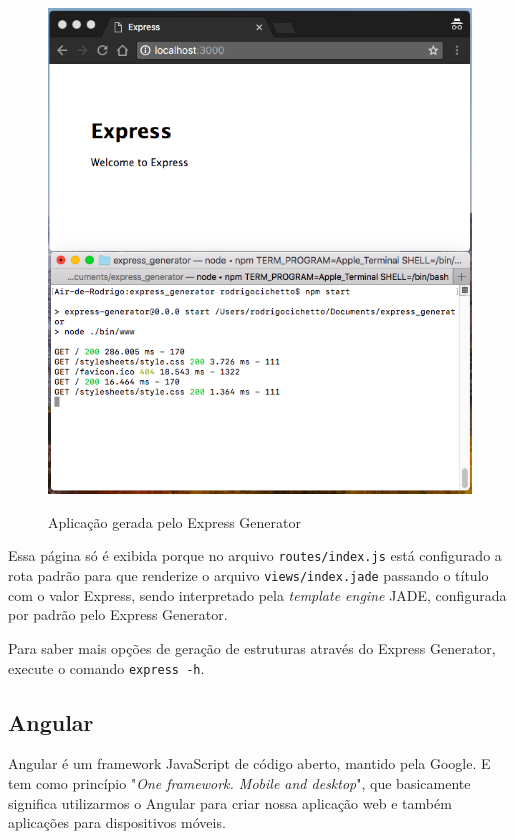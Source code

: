 \documentclass[
	12pt,				%
	openright,			%
	twoside,			%
	a4paper,			%
	english,			%
	brazil				%
	]{abntex2}
\begin{document}
\begin{figure}[h]
	\centering

	\caption{Aplicação gerada pelo Express Generator} \label{fig:ExpressGeneratorApp}
    \includegraphics[scale=0.5]{express-generator-app} \\

\end{figure}

Essa página só é exibida porque no arquivo \verb|routes/index.js| está configurado a rota padrão para que renderize o arquivo \verb|views/index.jade| passando o título com o valor Express, sendo interpretado pela \textit{template engine} JADE, configurada por padrão pelo Express Generator.

Para saber mais opções de geração de estruturas através do Express Generator, execute o comando \verb|express -h|.

\subsection{Angular}

Angular é um framework JavaScript de código aberto, mantido pela Google. E tem como princípio "\textit{One framework. Mobile and desktop}", que basicamente significa utilizarmos o Angular para criar nossa aplicação web e também aplicações para dispositivos móveis.
\end{document}

